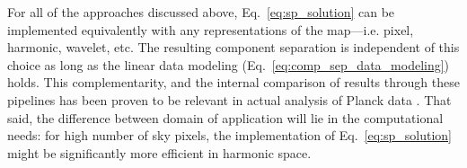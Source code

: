 For all of the approaches discussed above, Eq.~\ref{eq:sp_solution} can be implemented equivalently with any representations of the map---i.e. pixel, harmonic, wavelet, etc. The resulting component separation is independent of this choice as long as the linear data modeling (Eq.~\ref{eq:comp_sep_data_modeling}) holds. 
This complementarity, and the internal comparison of results through these pipelines has been proven to be relevant in actual analysis of Planck data \cite{planck15-9}. That said, the difference between domain of application will lie in the computational needs: for high number of sky pixels, the implementation of Eq.~\ref{eq:sp_solution} might be significantly more efficient in harmonic space. 



